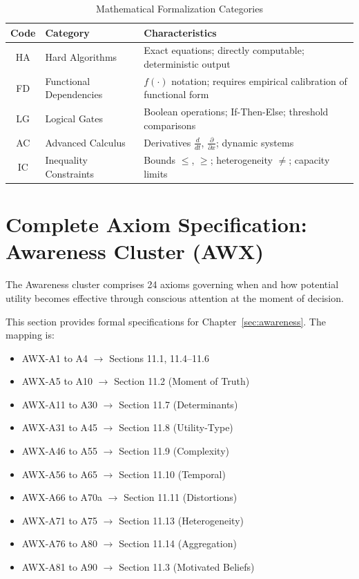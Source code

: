 \begin{table}[htbp]
\centering
\caption{Mathematical Formalization Categories}
\label{tab:categories}
\begin{tabular}{clp{8cm}}
\toprule
\textbf{Code} & \textbf{Category} & \textbf{Characteristics} \\
\midrule
HA & Hard Algorithms & Exact equations; directly computable; deterministic output \\
FD & Functional Dependencies & $f(\cdot)$ notation; requires empirical calibration of functional form \\
LG & Logical Gates & Boolean operations; If-Then-Else; threshold comparisons \\
AC & Advanced Calculus & Derivatives $\frac{d}{dt}$, $\frac{\partial}{\partial x}$; dynamic systems \\
IC & Inequality Constraints & Bounds $\leq$, $\geq$; heterogeneity $\neq$; capacity limits \\
\bottomrule
\end{tabular}
\end{table}

\section{Complete Axiom Specification: Awareness Cluster (AWX)}
\label{sec:awareness-axioms}

The Awareness cluster comprises 24 axioms governing when and how potential utility becomes effective through conscious attention at the moment of decision.


\begin{note}
This section provides formal specifications for Chapter~\ref{sec:awareness}. 
The mapping is:
\begin{itemize}
    \item AWX-A1 to A4 $\rightarrow$ Sections 11.1, 11.4--11.6
    \item AWX-A5 to A10 $\rightarrow$ Section 11.2 (Moment of Truth)
    \item AWX-A11 to A30 $\rightarrow$ Section 11.7 (Determinants)
    \item AWX-A31 to A45 $\rightarrow$ Section 11.8 (Utility-Type)
    \item AWX-A46 to A55 $\rightarrow$ Section 11.9 (Complexity)
    \item AWX-A56 to A65 $\rightarrow$ Section 11.10 (Temporal)
    \item AWX-A66 to A70a $\rightarrow$ Section 11.11 (Distortions)
    \item AWX-A71 to A75 $\rightarrow$ Section 11.13 (Heterogeneity)
    \item AWX-A76 to A80 $\rightarrow$ Section 11.14 (Aggregation)
    \item AWX-A81 to A90 $\rightarrow$ Section 11.3 (Motivated Beliefs)
\end{itemize}
\end{note}

